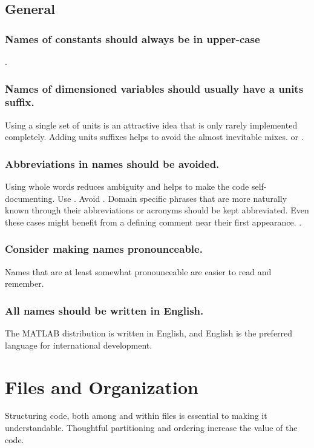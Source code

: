 \documentclass[titlepage,a4paper,12pt]{article}
\begin{document}
\subsection{General}

\subsubsection{Names of constants should always be in upper-case}
.

\subsubsection{Names of dimensioned variables should usually have a
units suffix.}

 Using a single set of units is an attractive idea that
is only rarely implemented completely. Adding units suffixes helps
to avoid the almost inevitable mixes.
 or .

\subsubsection{Abbreviations in names should be avoided.}

 Using whole words reduces
ambiguity and helps to make the code self-documenting. Use
. Avoid .
Domain specific phrases that are more naturally known through their
abbreviations or acronyms should be kept abbreviated. Even these
cases might benefit from a defining comment near their first
appearance. .

\subsubsection{Consider making names pronounceable.}

 Names that are at least
somewhat pronounceable are easier to read and remember.

\subsubsection{All names should be written in English.}

 The MATLAB distribution is
written in English, and English is the preferred language for
international development.

\section{Files and Organization}
 Structuring code, both among and within files
is essential to making it understandable. Thoughtful partitioning
and ordering increase the value of the code.
\end{document}

